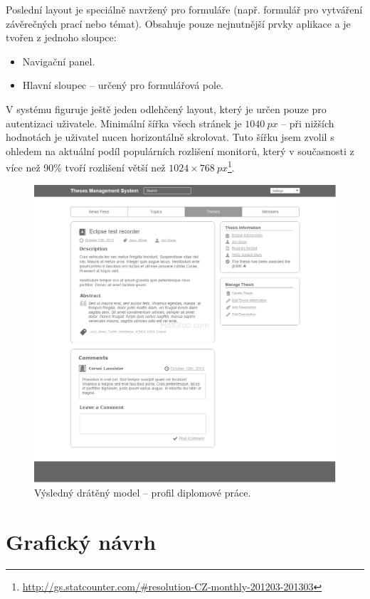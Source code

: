 Poslední layout je speciálně navržený pro formuláře (např. formulář pro vytváření závěrečných prací nebo témat). Obsahuje pouze nejnutnější prvky aplikace a je tvořen z jednoho sloupce:

\begin{itemize}
    \item Navigační panel.
    \item Hlavní sloupec -- určený pro formulářová pole.
\end{itemize}

V systému figuruje ještě jeden odlehčený layout, který je určen pouze pro autentizaci uživatele. Minimální šířka všech stránek je $1040~px$ -- při nižších hodnotách je uživatel nucen horizontálně skrolovat. Tuto šířku jsem zvolil s ohledem na aktuální podíl populárních rozlišení monitorů, který v současnosti z více než 90\% tvoří rozlišení větší než $1024\times768~px$\footnote{\url{http://gs.statcounter.com/\#resolution-CZ-monthly-201203-201303}}.

\begin{figure}[htbp]
    \centering
    \includegraphics[width=\textwidth]{images/main-layout.png}
    \caption{Výsledný drátěný model -- profil diplomové práce.}
    \label{img:layout1}
\end{figure}

\section{Grafický návrh}

